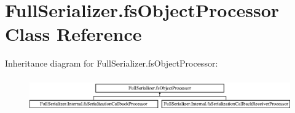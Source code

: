 \hypertarget{class_full_serializer_1_1fs_object_processor}{}\section{Full\+Serializer.\+fs\+Object\+Processor Class Reference}
\label{class_full_serializer_1_1fs_object_processor}


 


Inheritance diagram for Full\+Serializer.\+fs\+Object\+Processor\+:\begin{figure}[H]
\begin{center}
\leavevmode
\includegraphics[height=1.465969cm]{class_full_serializer_1_1fs_object_processor}
\end{center}
\end{figure}
